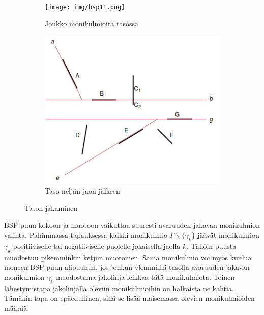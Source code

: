 ﻿\documentclass[a4paper, 12pt, titlepage]{article}
\begin{document}
\begin{figure}[htp]
 \centering
 \begin{subfigure}{0.5\textwidth} 
  \centering
  \texttt{[image: img/bsp11.png]}
  \vspace{0.75cm}
  \caption{Joukko monikulmioita tasossa}
  \label{bsp11}
 \end{subfigure}%
 \begin{subfigure}{0.5\textwidth} 
  \centering
  \includegraphics[width=0.9\linewidth]{img/bsp12.png}
  \caption{Taso neljän jaon jälkeen}
  \label{bsp12}
 \end{subfigure}
 \caption{Tason jakaminen}
 \vspace{-0.5cm}
 \label{bsp1}
\end{figure}


BSP-puun kokoon ja muotoon vaikuttaa suuresti avaruuden jakavan monikulmion valinta. Pahimmassa tapauksessa kaikki monikulmio $\Gamma\backslash\{\gamma_k\}$ jäävät monikulmion $\gamma_k$ positiiviselle tai negatiiviselle puolelle jokaisella jaolla $k$. Tällöin puusta muodostuu pikemminkin ketjun muotoinen. Sama monikulmio voi myös kuulua moneen BSP-puun alipuuhun, jos jonkun ylemmällä tasolla avaruuden jakavan monikulmion $\gamma_k$ muodostama jakolinja leikkaa tätä monikulmiota. \citep[.]{samet} Toinen lähestymistapa jakolinjalla oleviin monikulmioihin on halkaista ne kahtia. Tämäkin tapa on epäedullinen, sillä se lisää maisemassa olevien monikulmioiden määrää. \citep[.]{ranta}\\ %
\end{document}
